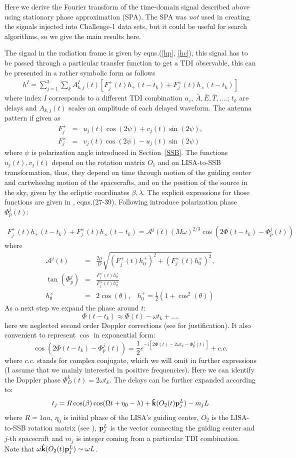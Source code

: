 \documentclass[11pt]{report}
\def\be{\begin{equation}}
\def\bea{\begin{eqnarray}}
\def\en{\end{equation}}
\def\ena{\end{eqnarray}}
\def\bk{{\bf \hat{k}}}
\def\bp{{\bf p} }
\begin{document}
Here we derive the Fourier transform of the time-domain signal 
described above using stationary phase approximation (SPA).
The SPA was {\it not} used in creating the signals injected into
Challenge-1 data sets, but it could be useful for search algorithms, so
we give the main results here.

The signal in the radiation frame is given by eqns.(\ref{hp},
\ref{hc}), this signal has to be passed through a particular 
transfer function to get a TDI observable, this can be presented in a rather symbolic form as follows
\bea
h^{I} = \sum_{j=1}^{3}\sum_k A_{k,j}^{I}(t)\left[ 
F^{+}_j(t)h_{+}(t-t_k) + F^{\times}_{j}(t)h_{\times}(t-t_k)
\right]
\ena
where index $I$ corresponds to a different TDI combination $\alpha_i$,
$\bar{A}, \bar{E}, \bar{T},....$; $t_k$ are delays and $A_{k,j}(t)$
 scales an amplitude of each delayed waveform. The antenna pattern 
if given as 
\bea
F_j^{+} &=& u_j(t)\cos(2\psi) + v_j(t)\sin(2\psi),\\
F_j^{\times} &=& v_j(t)\cos(2\psi) - u_j(t)\sin(2\psi)
\ena
where $\psi$ is polarization angle introduced in Section~\ref{SSB}. 
The functions $u_j(t), v_j(t)$ depend on the rotation matrix $O_1$
and on LISA-to-SSB transformation, thus, they depend on time through  motion of the guiding center and cartwheelng motion of the spacecrafts, and on the position of the source in the sky,
given by the ecliptic coordinates $\beta,\lambda$. The explicit 
expressions for those functions are given in \cite{KTV}, eqns.(27-39). 
Following \cite{Cutler} introduce polarization phase $\Phi_p^j(t)$:

\bea
F^{+}_j(t)h_{+}(t-t_k) + F^{\times}_{j}(t)h_{\times}(t-t_k) =
\mathcal{A}^j(t)(M\omega)^{2/3}\cos(2\Phi(t-t_k) -\Phi_p^j(t))
\ena
where
\bea
\mathcal{A}^j(t) &=& \frac{2\mu}{D} \sqrt{(F^{+}_j(t)h^{+}_0)^2 + 
(F^{\times}_{j}(t)h^{\times}_0)^2},\\
\tan(\Phi_p^j) &=& \frac{F^{\times}_{j}(t)h^{\times}_0}
{F^{+}_{j}(t)h^{+}_0}\\
h^{\times}_0 &=& 2\cos(\theta),\;\;\; 
h^{+}_0 = \frac1{2}(1 + \cos^2(\theta))
\ena
As a next step we expand the phase around $t$:
\be
\Phi(t - t_k) \approx \Phi(t) - \omega t_k +....
\en
here we neglected second order Doppler corrections (see \cite{Cutler}
for justification).
It also convenient to represent $\cos$ in exponential form:
\be
\cos(2\Phi(t-t_k) - \Phi_p^j(t)) = \frac1{2}
e^{-i\left[ 2\Phi(t) - 2\omega t_k  - \Phi_p^j(t)\right]} + c.c.
\en
where $c.c.$ stands for complex conjugate, which we will omit 
in further expressions (I assume that we mainly interested in 
positive frequencies).
Here we can identify the Doppler phase $\Phi^k_D(t) = 2\omega t_k$.
The delays can be further expanded according to:
\bea
t_j = R \cos(\beta) \cos(\Omega t + \eta_0 -\lambda) +
\bk(O_2(t)\bp_j^L) - m_jL
\ena
where $R=1au$, $\eta_0$ is initial phase of the LISA's guiding 
center, $O_2$ is the LISA-to-SSB rotation matrix (see \cite{KTV}),
$\bp^L_j$ is the vector connecting the guiding center and $j$-th spacecraft and $m_j$ is integer coming from a particular TDI combination. Note that $\omega \bk(O_2(t)\bp_j^L) \sim \omega L$.
\end{document}
